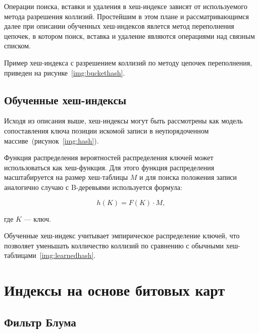 Операции поиска, вставки и удаления в хеш-индексе зависят от используемого
метода разрешения коллизий. Простейшим в этом плане и рассматривающимся далее
при описании обученных хеш-индексов явлется метод переполнения цепочек, в
котором поиск, вставка и удаление являются операциями над связным списком.

Пример хеш-индекса с разрешением коллизий по методу цепочек переполнения,
приведен на рисунке~\ref{img:buckethash}.


%
%
%

\subsection{Обученные хеш-индексы}

Исходя из описания выше, хеш-индексы могут быть рассмотрены как модель
сопоставления ключа позиции искомой записи в неупорядоченном
массиве~(рисунок~\ref{img:hash}).


Функция распределения вероятностей распределения ключей может использоваться как
хеш-функция. Для этого функция распределения масштабируется на размер
хеш-таблицы $M$ и для поиска положения записи аналогично случаю с B-деревьями
используется формула:

\begin{equation}
    h(K) = F(K) \cdot M,
\end{equation}

где $K$ --- ключ.

Обученные хеш-индекс учитывает эмпирическое распределение ключей, что позволяет
уменьшать колличество коллизий по сравнению с обычными
хеш-таблицами~\ref{img:learnedhash}.


\section{Индексы на основе битовых карт}

\subsection{Фильтр Блума}

